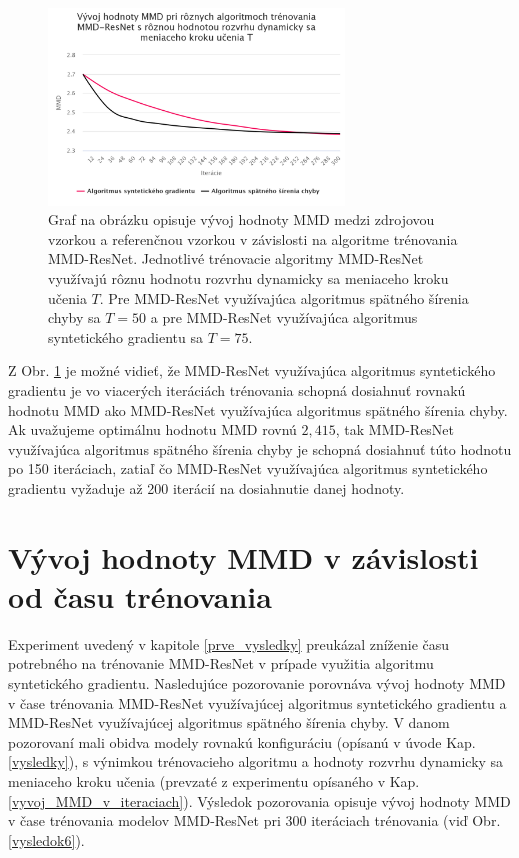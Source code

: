 \begin{figure}
\centerline{\includegraphics[width=0.7\textwidth]{images/experimenty/experiment5.png}}
\caption[Vývoj hodnoty MMD pri rôznych algoritmoch trénovania MMD-ResNet s rôznou hodnotou rozvrhu dynamicky sa meniaceho kroku učenia $T$]{Graf na obrázku opisuje vývoj hodnoty MMD medzi zdrojovou vzorkou a referenčnou vzorkou v závislosti na algoritme trénovania MMD-ResNet. Jednotlivé trénovacie algoritmy MMD-ResNet využívajú rôznu hodnotu rozvrhu dynamicky sa meniaceho kroku učenia $T$. Pre MMD-ResNet využívajúca algoritmus spätného šírenia chyby sa $T=50$ a pre MMD-ResNet využívajúca algoritmus syntetického gradientu sa $T=75$.}
\label{vysledok5}
\end{figure}

Z Obr. \ref{vysledok5} je možné vidieť, že MMD-ResNet využívajúca algoritmus syntetického gradientu je vo viacerých iteráciách trénovania schopná dosiahnuť rovnakú hodnotu MMD ako MMD-ResNet využívajúca algoritmus spätného šírenia chyby. Ak uvažujeme optimálnu hodnotu MMD rovnú $2,415$, tak MMD-ResNet využívajúca algoritmus spätného šírenia chyby je schopná dosiahnuť túto hodnotu po 150 iteráciach, zatiaľ čo MMD-ResNet využívajúca algoritmus syntetického gradientu vyžaduje až 200 iterácií na dosiahnutie danej hodnoty.

\section{Vývoj hodnoty MMD v závislosti od času trénovania}

Experiment uvedený v kapitole \ref{prve_vysledky} preukázal zníženie času potrebného na trénovanie MMD-ResNet v prípade využitia algoritmu syntetického gradientu. Nasledujúce pozorovanie porovnáva vývoj hodnoty MMD v čase trénovania MMD-ResNet využívajúcej algoritmus syntetického gradientu a MMD-ResNet využívajúcej algoritmus spätného šírenia chyby. V danom pozorovaní mali obidva modely rovnakú konfiguráciu (opísanú v úvode Kap. \ref{vysledky}), s výnimkou trénovacieho algoritmu a hodnoty rozvrhu dynamicky sa meniaceho kroku učenia (prevzaté z experimentu opísaného v Kap. \ref{vyvoj_MMD_v_iteraciach}). Výsledok pozorovania opisuje vývoj hodnoty MMD v čase trénovania modelov MMD-ResNet pri 300 iteráciach trénovania (viď Obr. \ref{vysledok6}).

